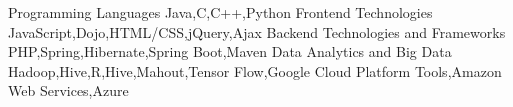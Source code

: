 \begin{cvhonors}
  \cvhonor
    {Programming Languages}
    {Java,C,C++,Python}
    {}
    {}
  \cvhonor
    {Frontend Technologies}
    {JavaScript,Dojo,HTML/CSS,jQuery,Ajax}
    {}
    {}
  \cvhonor
    {Backend Technologies and Frameworks}
    {PHP,Spring,Hibernate,Spring Boot,Maven}
    {}
    {}
   \cvhonor
    {Data Analytics and Big Data}
    {Hadoop,Hive,R,Hive,Mahout,Tensor Flow,Google Cloud Platform Tools,Amazon Web Services,Azure}
    {}
    {}
\end{cvhonors}
